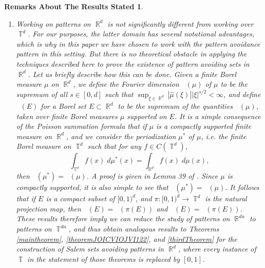 \documentclass[dvipsnames,letterpaper,12pt]{article}
\numberwithin{equation}{section}
\DeclareMathOperator{\hausdim}{\dim_{\mathbb{H}}}
\DeclareMathOperator{\fordim}{\dim_{\mathbb{F}}}
\DeclareMathOperator{\RR}{\mathbb{R}}
\DeclareMathOperator{\TT}{\mathbb{T}}
\newtheorem*{remarksaboutresults}{Remarks About The Results Stated}
\numberwithin{theorem}{section}
\begin{document}
\begin{remarksaboutresults}
\begin{enumerate}
        \item Working on patterns on $\RR^d$ is not significantly different from working over $\TT^d$. For our purposes, the latter domain has several notational advantages, which is why in this paper we have chosen to work with the pattern avoidance pattern in this setting. But there is no theoretical obstacle in applying the techniques described here to prove the existence of pattern avoiding sets in $\RR^d$. Let us briefly describe how this can be done. Given a finite Borel measure $\mu$ on $\RR^d$, we define the Fourier dimension $\fordim(\mu)$ of $\mu$ to be the supremum of all $s \in [0,d]$ such that $\sup_{\xi \in \RR^d} |\widehat{\mu}(\xi)| |\xi|^{s/2} < \infty$, and define $\fordim(E)$ for a Borel set $E \subset \RR^d$ to be the supremum of the quantities $\fordim(\mu)$, taken over finite Borel measures $\mu$ supported on $E$. It is a simple consequence of the Poisson summation formula that if $\mu$ is a compactly supported finite measure on $\RR^d$, and we consider the \emph{periodization} $\mu^*$ of $\mu$, i.e. the finite Borel measure on $\TT^d$ such that for any $f \in C(\TT^d)$,
    \begin{equation}
        \int_{\TT^d} f(x)\; d\mu^*(x) = \int_{\RR^d} f(x)\; d\mu(x),
    \end{equation}
    then $\fordim(\mu^*) = \fordim(\mu)$. A proof is given in Lemma 39 of \cite{MyThesis}. Since $\mu$ is compactly supported, it is also simple to see that $\hausdim(\mu^*) = \hausdim(\mu)$. It follows that if $E$ is a compact subset of $[0,1)^d$, and $\pi: [0,1)^d \to \TT^d$ is the natural projection map, then $\fordim(E) = \fordim(\pi(E))$ and $\hausdim(E) = \hausdim(\pi(E))$. These results therefore imply we can reduce the study of patterns on $\RR^{dn}$ to patterns on $\TT^{dn}$, and thus obtain analogous results to Theorems \ref{maintheorem}, \ref{theoremJOICVIOJVI122}, and \ref{thirdTheorem} for the construction of Salem sets avoiding patterns in $\RR^d$, where every instance of $\TT$ in the statement of those theorems is replaced by $[0,1]$.
    \end{enumerate}
\end{remarksaboutresults}

\end{document}
